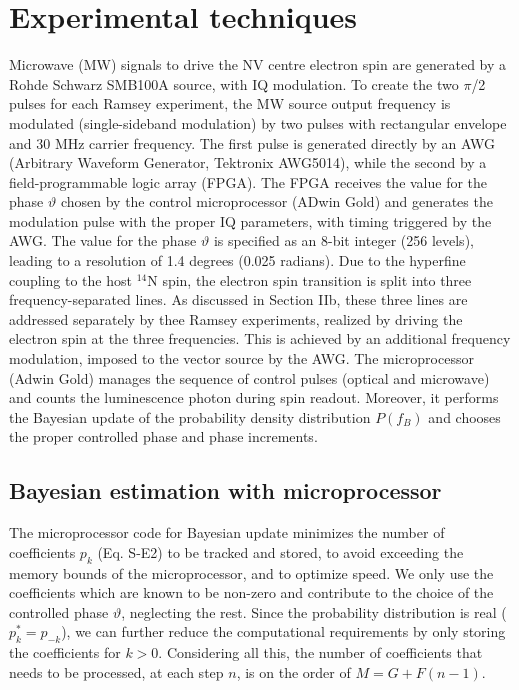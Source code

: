 \documentclass{report}
\begin{document}
\section{Experimental techniques}

Microwave (MW) signals to drive the NV centre electron spin are generated by a Rohde Schwarz SMB100A source, with IQ modulation.  To create the two $\pi$/2 pulses for each Ramsey experiment, the MW source output frequency is modulated (single-sideband modulation) by two pulses with rectangular envelope and 30 MHz carrier frequency. The first pulse is generated directly by an AWG (Arbitrary Waveform Generator, Tektronix AWG5014), while the second by a field-programmable logic array (FPGA). The FPGA receives the value for the phase $\vartheta$ chosen by the control microprocessor (ADwin Gold) and generates the modulation pulse with the proper IQ parameters, with timing triggered by the AWG. The value for the phase $\vartheta$ is specified as an 8-bit integer (256 levels), leading to a resolution of 1.4 degrees (0.025 radians).
Due to the hyperfine coupling to the host $^{14}$N spin, the electron spin transition is split into three frequency-separated lines. As discussed in Section IIb, these three lines are addressed separately by thee Ramsey experiments, realized by driving the electron spin at the three frequencies. This is achieved by an additional frequency modulation, imposed to the vector source by the AWG. The microprocessor (Adwin Gold) manages the sequence  of control pulses (optical and microwave) and counts the luminescence photon during spin readout. Moreover, it performs the Bayesian update of the probability density distribution $P(f_B)$ and chooses the proper controlled phase and phase increments. 

\subsection{Bayesian estimation with microprocessor}
The microprocessor code for Bayesian update minimizes the number of coefficients $p_k$ (Eq. S-E2) to be tracked and stored, to avoid exceeding the memory bounds of the microprocessor, and to optimize speed. We only use the coefficients which are known to be non-zero and contribute to the choice of the controlled phase $\vartheta$, neglecting the rest. Since the probability distribution is real ($p_k^* = p_{-k}$), we can further reduce the computational requirements by only storing the coefficients for $k>0$. Considering all this, the number of coefficients that needs to be processed, at each step $n$, is on the order of $M = G+F(n-1)$.
\end{document}
